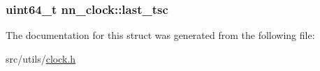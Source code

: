 \subsubsection[{last\+\_\+tsc}]{\setlength{\rightskip}{0pt plus 5cm}uint64\+\_\+t nn\+\_\+clock\+::last\+\_\+tsc}\hypertarget{structnn__clock_ae1c93ad0ea0d06895e0f116f2c132b89}{}\label{structnn__clock_ae1c93ad0ea0d06895e0f116f2c132b89}


The documentation for this struct was generated from the following file\+:\begin{DoxyCompactItemize}
\item 
src/utils/\hyperlink{clock_8h}{clock.\+h}\end{DoxyCompactItemize}
